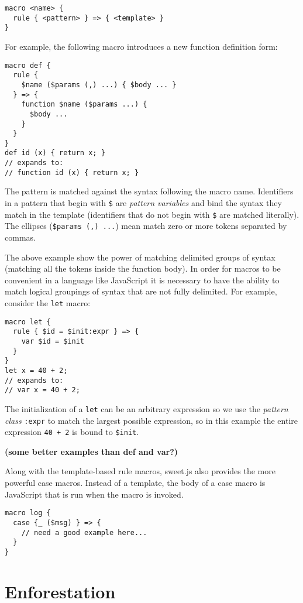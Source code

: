 \documentclass[preprint,10pt]{sigplanconf}
\begin{document}
\begin{lstlisting}
macro <name> {
  rule { <pattern> } => { <template> }
}
\end{lstlisting}

For example, the following macro introduces a new function definition
form:

\begin{lstlisting}
macro def {
  rule { 
    $name ($params (,) ...) { $body ... } 
  } => {
    function $name ($params ...) {
      $body ...
    }
  }
}
def id (x) { return x; }
// expands to:
// function id (x) { return x; }
\end{lstlisting}

The pattern is matched against the syntax following the macro name.
Identifiers in a pattern that begin with \verb!$! are
\emph{pattern variables} and bind the syntax they match in the
template (identifiers that do not begin with \verb!$! are matched
literally). The ellipses (\verb!$params (,) ...!) mean match zero or more
tokens separated by commas.

The above example show the power of matching delimited groups of
syntax (\ie matching all the tokens inside the function body). In
order for macros to be convenient in a language like JavaScript it is
necessary to have the ability to match logical groupings of syntax
that are not fully delimited. For example, consider the
\verb!let! macro:

\begin{lstlisting}
macro let {
  rule { $id = $init:expr } => {
    var $id = $init
  }
}
let x = 40 + 2;
// expands to:
// var x = 40 + 2;
\end{lstlisting}

The initialization of a \verb!let! can be an arbitrary expression
so we use the \emph{pattern class} \verb!:expr! to match the
largest possible expression, so in this example the entire expression
\verb!40 + 2! is bound to \verb!$init!.

\textbf{(some better examples than def and var?)}

Along with the template-based rule macros, sweet.js also provides the
more powerful case macros. Instead of a template, the body of a case
macro is JavaScript that is run when the macro is invoked.

\begin{lstlisting}
macro log {
  case {_ ($msg) } => {
    // need a good example here...
  }
}
\end{lstlisting}


\section{Enforestation}
\label{sec:enforest}
\end{document}
